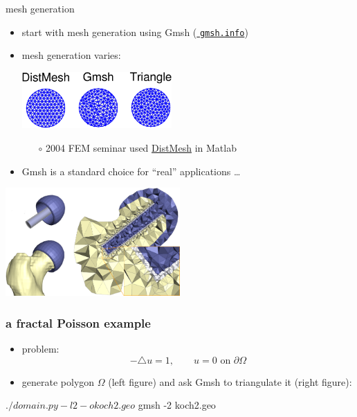 \documentclass[hide notes,intlimits,usenames,dvipsnames]{beamer}
\begin{document}
\begin{frame}{mesh generation}
\begin{itemize}
\item start with mesh generation using Gmsh (\href{http://gmsh.info/}{\color{blue} \texttt{gmsh.info}})
\item mesh generation varies:

\medskip
\begin{center}
\includegraphics[width=0.45\textwidth]{meshcomparison}
\end{center}

    \vspace{-1mm}
    \begin{itemize}
    \item[$\circ$] 2004 FEM seminar used \href{https://popersson.github.io/distmesh/}{\color{blue} DistMesh} in Matlab
    \end{itemize}

\item Gmsh is a standard choice for ``real'' applications \dots
\end{itemize}

\begin{center}
\includegraphics[width=0.5\textwidth]{hipjoint}
\end{center}
\end{frame}


\begin{frame}[fragile]
\frametitle{a fractal Poisson example}
\begin{itemize}
\item problem:
    $$-\triangle u = 1, \qquad u=0 \text{ on } \partial\Omega$$
\item generate polygon $\Omega$ (left figure) and ask Gmsh to triangulate it (right figure):
\end{itemize}

\begin{cline}
$ ./domain.py -l 2 -o koch2.geo
$ gmsh -2 koch2.geo
\end{cline}

\begin{center}
 \qquad 
\end{center}
\end{frame}
\end{document}
